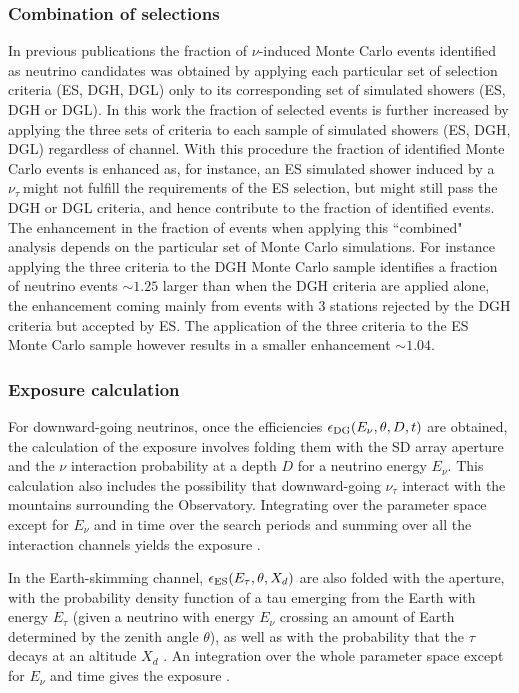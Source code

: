 \documentclass[reprint,showpacs,showkeys,amsmath,amssymb,aps,nofootinbib]{revtex4-1}
\def \nutau {$\nu_\tau~$}
\begin{document}
\subsubsection{Combination of selections}

In previous publications \cite{ES,DGH,DGL} the fraction of $\nu$-induced Monte Carlo events 
identified as neutrino candidates was obtained by applying each particular set of 
selection criteria (ES, DGH, DGL) only to its corresponding set of simulated showers 
(ES, DGH or DGL). In this work the fraction of selected events is further increased by applying 
the three sets of criteria to each sample of simulated showers (ES, DGH, DGL) regardless of channel. 
With this procedure the fraction of identified Monte Carlo events is enhanced as, for instance, 
an ES simulated shower induced by a \nutau might not fulfill the requirements of the ES selection, 
but might still pass the DGH or DGL criteria, and hence contribute to the fraction of identified
events. The enhancement in the fraction of events when applying this ``combined" analysis
depends on the particular set of Monte Carlo simulations. For instance applying the 
three criteria to the DGH Monte Carlo sample identifies a fraction of neutrino events 
$\sim 1.25$ larger than when the DGH criteria are applied alone, the enhancement
coming mainly from events with 3 stations rejected by the DGH criteria but accepted by ES.
The application of the three criteria to the ES Monte Carlo
sample however results in a smaller enhancement $\sim 1.04$. 

\subsubsection{Exposure calculation}
 
For downward-going neutrinos, once the efficiencies $\epsilon_{\rm DG}(E_\nu,\theta,D,t)$ 
are obtained, the calculation 
of the exposure involves folding them with the SD array aperture and the $\nu$ interaction probability
at a depth $D$ for a neutrino energy $E_\nu$.  
This calculation also includes the possibility that downward-going $\nu_\tau$ interact
with the mountains surrounding the Observatory. 
Integrating over the parameter space except for $E_\nu$ and in time over the search periods 
and summing over all the interaction channels yields the exposure \cite{DGH,DGL}. 

In the Earth-skimming channel, $\epsilon_{\rm ES}(E_\tau,\theta,X_d)$
are also folded with the aperture, with the probability density function of a tau emerging from the
Earth with energy $E_\tau$ (given a neutrino with energy $E_\nu$ crossing an amount of Earth
determined by the zenith angle $\theta$), as well as with the probability that 
the $\tau$ decays at an altitude $X_d$ \cite{ES}. An integration over the whole parameter
space except for $E_\nu$ and time gives the exposure \cite{ES}. 
\end{document}
